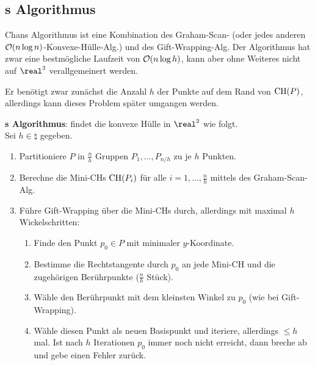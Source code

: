 \pagebreak

\subsection{%
    s Algorithmus%
}

Chans Algorithmus ist eine Kombination des Graham-Scan-
(oder jedes anderen $\mathcal{O}(n \log n)$-Konvexe-Hülle-Alg.)
und des Gift-Wrapping-Alg.
Der Algorithmus hat zwar eine bestmögliche Laufzeit von $\mathcal{O}(n \log h)$,
kann aber ohne Weiteres nicht auf $\real^3$ verallgemeinert werden.

Er benötigt zwar zunächst die Anzahl $h$ der Punkte auf dem Rand von $\operatorname{CH}(P)$,
allerdings kann dieses Problem später umgangen werden.

\textbf{s Algorithmus}:
 findet die konvexe Hülle in $\real^2$ wie folgt.\\
Sei $h \in \natural$ gegeben.
\begin{enumerate}
    \item
    Partitioniere $P$ in $\frac{n}{h}$ Gruppen $P_1, \dotsc, P_{n/h}$ zu je $h$ Punkten.

    \item
    Berechne die Mini-CHs $\operatorname{CH}(P_i)$ für alle $i = 1, \dotsc, \frac{n}{h}$ mittels des
    Graham-Scan-Alg.

    \item
    Führe Gift-Wrapping über die Mini-CHs durch, allerdings mit maximal $h$ Wickelschritten:
    \begin{enumerate}[label=\emph{(\roman*)}]
        \item
        Finde den Punkt $p_0 \in P$ mit minimaler $y$-Koordinate.

        \item
        Bestimme die Rechtstangente durch $p_0$ an jede Mini-CH und die zugehörigen
        Berührpunkte ($\frac{n}{h}$ Stück).

        \item
        Wähle den Berührpunkt mit dem kleinsten Winkel zu $p_0$ (wie bei Gift-Wrapping).

        \item
        Wähle diesen Punkt als neuen Basispunkt und iteriere,
        allerdings $\le h$ mal.
        Ist nach $h$ Iterationen $p_0$ immer noch nicht erreicht, dann breche ab und
        gebe einen Fehler zurück.
    \end{enumerate}
\end{enumerate}

